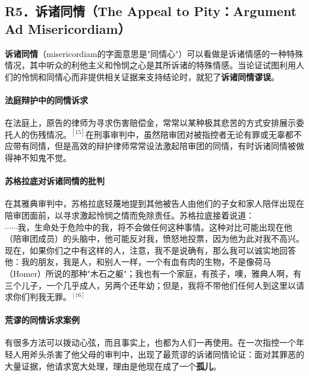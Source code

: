 \subsection{R5．诉诸同情（The Appeal to Pity：Argument Ad Misericordiam）}

\textbf{诉诸同情}（misericordiam的字面意思是"同情心"）可以看做是诉诸情感的一种特殊情况，其中听众的利他主义和怜悯之心是其所诉诸的特殊情感。当论证试图利用人们的怜悯和同情心而非提供相关证据来支持结论时，就犯了\textbf{诉诸同情谬误}。

\paragraph{法庭辩护中的同情诉求}
在法庭上，原告的律师为寻求伤害赔偿金，常常以某种极其悲苦的方式安排展示委托人的伤残情况。${ }^{[15]}$在刑事审判中，虽然陪审团对被指控者无论有罪或无辜都不应带有同情，但是高效的辩护律师常常设法激起陪审团的同情，有时诉诸同情被做得神不知鬼不觉。

\paragraph{苏格拉底对诉诸同情的批判}
在其雅典审判中，苏格拉底轻蔑地提到其他被告人由他们的子女和家人陪伴出现在陪审团面前，以寻求激起怜悯之情而免除责任。苏格拉底接着说道：\\
$\cdots \cdots$我，生命处于危险中的我，将不会做任何这种事情。这种对比可能出现在他（陪审团成员）的头脑中，他可能反对我，愤怒地投票，因为他为此对我不高兴。现在，如果你们之中有这样的人，注意，我不是说确有，那么我可以诚实地回答他：我的朋友，我是人，和别人一样，一个有血有肉的生物，不是像荷马（Homer）所说的那种"木石之躯"；我也有一个家庭，有孩子，噢，雅典人啊，有三个儿子，一个几乎成人，另两个还年幼；但是，我将不带他们任何人到这里以请求你们判我无罪。${ }^{[16]}$

\paragraph{荒谬的同情诉求案例}
有很多方法可以拨动心弦，而且事实上，也都为人们一再使用。在一次指控一个年轻人用斧头杀害了他父母的审判中，出现了最荒谬的诉诸同情论证：面对其罪恶的大量证据，他请求宽大处理，理由是他现在成了一个\textbf{孤儿}。 